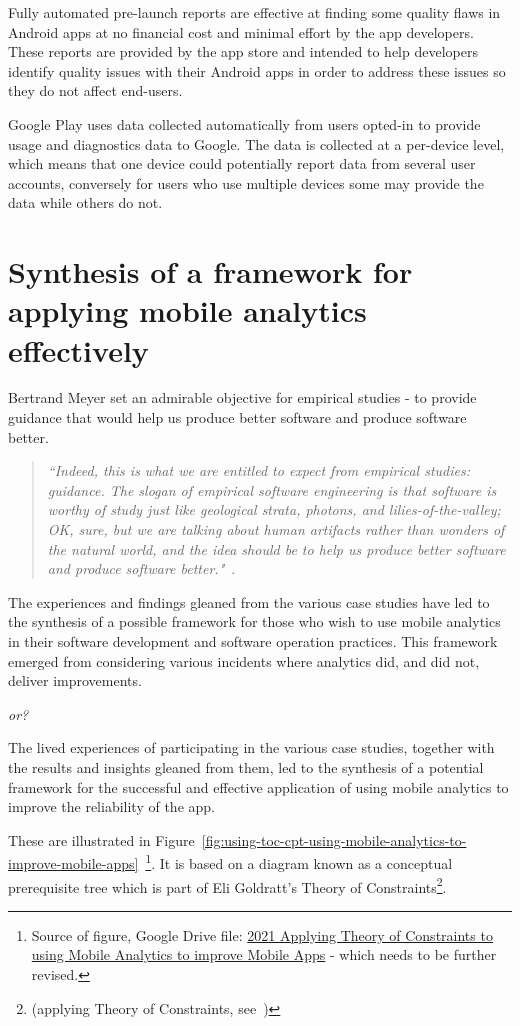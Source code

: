 Fully automated pre-launch reports are effective at finding some quality flaws in Android apps at no financial cost and minimal effort by the app developers. These reports are provided by the app store and intended to help developers identify quality issues with their Android apps in order to address these issues so they do not affect end-users.


Google Play uses data collected automatically from users opted-in to provide usage and diagnostics data to Google. The data is collected at a per-device level, which means that one device could potentially report data from several user accounts, conversely for users who use multiple devices some may provide the data while others do not.


\section{Synthesis of a framework for applying mobile analytics effectively}
Bertrand Meyer set an admirable objective for empirical studies - to provide guidance that would help us produce better software and produce software better. 
\begin{quote}
    \emph{``Indeed, this is what we are entitled to expect from empirical studies: guidance. The slogan of empirical software engineering is that software is worthy of study just like geological strata, photons, and lilies-of-the-valley; OK, sure, but we are talking about human artifacts rather than wonders of the natural world, and the idea should be to help us produce better software and produce software better."}~\citep{meyer2018_towards_empirical_answers_to_important_engineering_questions}.
\end{quote}

The experiences and findings gleaned from the various case studies have led to the synthesis of a possible framework for those who wish to use mobile analytics in their software development and software operation practices. This framework emerged from considering various incidents where analytics did, and did not, deliver improvements.

\textit{or?}

The lived experiences of participating in the various case studies, together with the results and insights gleaned from them, led to the synthesis of a potential framework for the successful and effective application of using mobile analytics to improve the reliability of the app. 

These are illustrated in Figure~\ref{fig:using-toc-cpt-using-mobile-analytics-to-improve-mobile-apps}~\footnote{Source of figure, Google Drive file:  \href{https://docs.google.com/document/d/16PaSFRVzg1b2Nykly8qzaTAHtJqtEwgrK754wuek53M/edit}{2021 Applying Theory of Constraints to using Mobile Analytics to improve Mobile Apps} - which needs to be further revised.}. It is based on a diagram known as a conceptual prerequisite tree which is part of Eli Goldratt's Theory of Constraints\footnote{(applying Theory of Constraints, see~\citep{goldratt2017_necessary_but_not_sufficient, lepore1999_deming_and_goldratt, scheinkopf1999_thinking_for_a_change})}. 

